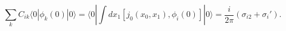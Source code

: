 \begin{equation}
\sum_k C_{ik}\langle 0| \phi_k(0)|0 \rangle = \langle 0|\int d x_1 
[j_0(x_0, x_1),\phi_i(0)]|0 \rangle = 
\frac{i}{2 \pi} (\sigma_{i2}+ \sigma_i').
\label{VEV}
\end{equation}


